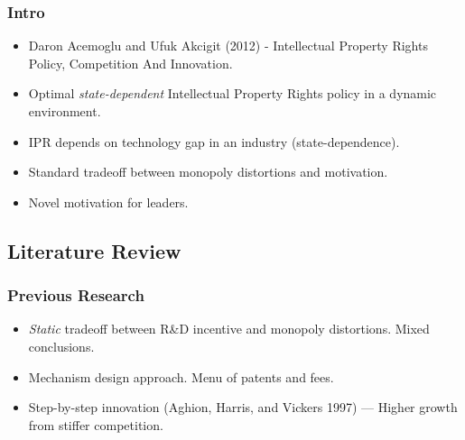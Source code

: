 \documentclass{beamer}
\begin{document}
\begin{frame}[t]\frametitle{Intro}
  \begin{itemize}
    \item<+-> Daron Acemoglu and Ufuk Akcigit (2012) - Intellectual Property Rights Policy, Competition And Innovation.
    \item<+-> Optimal \emph{state-dependent} Intellectual Property Rights policy in a dynamic environment.
    \item<+-> IPR depends on technology gap in an industry (state-dependence).
    \item<+-> Standard tradeoff between monopoly distortions and motivation.
    \item<+-> Novel motivation for leaders.
  \end{itemize}
\end{frame}

\subsection{Literature Review}
\label{sub:literature_review}
\begin{frame}[t]\frametitle{Previous Research} 
  \begin{itemize}
    \item<+-> \emph{Static} tradeoff between R\&D incentive and monopoly distortions. Mixed conclusions.
    \item<+-> Mechanism design approach.  Menu of patents and fees.
    \item<+-> Step-by-step innovation (Aghion, Harris, and Vickers 1997) --- Higher growth from stiffer competition.
  \end{itemize}
\end{frame}


\end{document}
